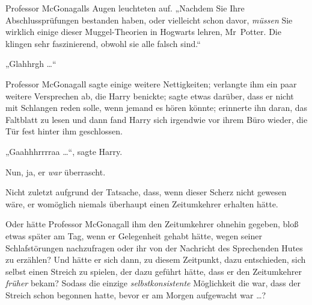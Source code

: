 Professor McGonagalls Augen leuchteten auf.
„Nachdem Sie Ihre Abschlussprüfungen bestanden haben, oder vielleicht schon davor, \emph{müssen} Sie wirklich einige dieser Muggel-Theorien in Hogwarts lehren, Mr~Potter. Die klingen sehr faszinierend, obwohl sie alle falsch sind.“

„Glahhrgh …“

Professor McGonagall sagte einige weitere Nettigkeiten; verlangte ihm ein paar weitere Versprechen ab, die Harry benickte; sagte etwas darüber, dass er nicht mit Schlangen reden solle, wenn jemand es hören könnte; erinnerte ihn daran, das Faltblatt zu lesen und dann fand Harry sich irgendwie vor ihrem Büro wieder, die Tür fest hinter ihm geschlossen.

„Gaahhhrrrraa …“, sagte Harry.

Nun, ja, er \emph{war} überrascht.

Nicht zuletzt aufgrund der Tatsache, dass, wenn dieser Scherz nicht gewesen wäre, er womöglich niemals überhaupt einen Zeitumkehrer erhalten hätte.

Oder hätte Professor McGonagall ihm den Zeitumkehrer ohnehin gegeben, bloß etwas später am Tag, wenn er Gelegenheit gehabt hätte, wegen seiner Schlafstörungen nachzufragen oder ihr von der Nachricht des Sprechenden Hutes zu erzählen? Und hätte er sich dann, zu diesem Zeitpunkt, dazu entschieden, sich selbst einen Streich zu spielen, der dazu geführt hätte, dass er den Zeitumkehrer \emph{früher} bekam? Sodass die einzige \emph{selbstkonsistente} Möglichkeit die war, dass der Streich schon begonnen hatte, bevor er am Morgen aufgewacht war …?

